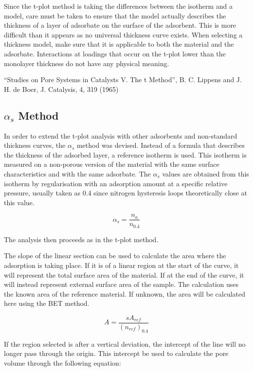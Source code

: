 Since the t-plot method is taking the differences between the
isotherm and a model, care must be taken to ensure that the model
actually describes the thickness of a layer of adsorbate on the
surface of the adsorbent. This is more difficult than it
appears as no universal thickness curve exists.
When selecting a thickness model, make sure that it is applicable
to both the material and the adsorbate.
Interactions at loadings that occur on the t-plot lower than the monolayer
thickness do not have any physical meaning.


“Studies on Pore Systems in Catalysts V. The t Method”,
B. C. Lippens and J. H. de Boer, J. Catalysis, 4, 319 (1965)

\subsection{\(\alpha_s\) Method}

In order to extend the t-plot analysis with other adsorbents and non-standard
thickness curves, the \(\alpha_s\) method was devised. Instead of
a formula that describes the thickness of the adsorbed layer, a reference
isotherm is used. This isotherm is measured on a non-porous version of the
material with the same surface characteristics and with the same adsorbate.
The \(\alpha_s\) values are obtained from this isotherm by regularisation with
an adsorption amount at a specific relative pressure, usually taken as 0.4 since
nitrogen hysteresis loops theoretically close at this value.

\begin{equation}
	\alpha_s = \frac{n_a}{n_{0.4}}
\end{equation}

The analysis then proceeds as in the t-plot method.

The slope of the linear section can be used to calculate the area
where the adsorption is taking place. If it is of a linear region
at the start of the curve, it will represent the total surface area
of the material. If at the end of the curve, it will instead
represent external surface area of the sample.
The calculation uses the known area of the reference material.
If unknown, the area will be calculated here using the BET method.

\begin{equation}
	A = \frac{s A_{ref}}{(n_{ref})_{0.4}}
\end{equation}


If the region selected is after a vertical deviation, the intercept of the line
will no longer pass through the origin. This intercept be used to calculate the
pore volume through the following equation:

